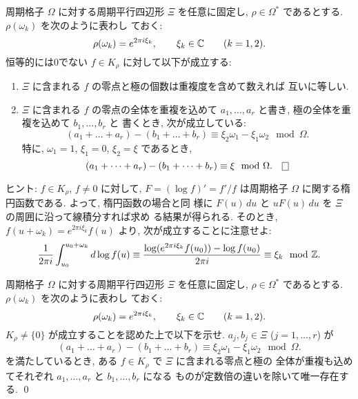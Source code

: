 \documentclass[12pt,twoside]{jarticle}
\def\Z{{\Bbb Z}} %
\def\C{{\Bbb C}} %
\begin{document}
\medskip


\begin{question}
  周期格子 $\Omega$ に対する周期平行四辺形 $\Xi$ を任意に固定し, %
  $\rho\in\Omega^*$ であるとする. $\rho(\omega_k)$ を次のように表わし
  ておく:
  \[
    \rho(\omega_k) = e^{2\pi i\xi_k},
    \qquad
    \xi_k\in\C
    \qquad
    (k=1,2).
  \] %
  恒等的には0でない $f\in K_\rho$ に対して以下が成立する:
  \begin{enumerate}
  \item $\Xi$ に含まれる $f$ の零点と極の個数は重複度を含めて数えれば
    互いに等しい.
  \item $\Xi$ に含まれる $f$ の零点の全体を重複を込めて %
    $a_1,\dots,a_r$ と書き, 極の全体を重複を込めて $b_1,\dots,b_r$ と
    書くとき, 次が成立している:
    \[
      (a_1 + \dots + a_r) - (b_1 + \dots + b_r)
      \equiv
      \xi_2\omega_1 - \xi_1\omega_2
      \mod \Omega. 
    \]
    特に, $\omega_1=1$, $\xi_1=0$, $\xi_2=\xi$ であるとき,
    \[
      (a_1 + \dots + a_r) - (b_1 + \dots + b_r)
      \equiv
      \xi
      \mod \Omega. 
    \qed
    \]
  \end{enumerate}
\end{question}

\noindent ヒント: $f\in K_\rho$, $f\ne0$ に対して, $F=(\log f)'=f'/f$ 
は周期格子 $\Omega$ に関する楕円函数である. よって, 楕円函数の場合と同
様に $F(u)\,du$ と $uF(u)\,du$ を $\Xi$ の周囲に沿って線積分すれば求め
る結果が得られる. そのとき, $f(u+\omega_k)=e^{2\pi i\xi_k}f(u)$ より, 
次が成立することに注意せよ:
\[
  \frac{1}{2\pi i}\int_{u_0}^{u_0+\omega_k} d\log f(u)
  \equiv \frac{\log (e^{2\pi i\xi_k}f(u_0))  - \log f(u_0)}{2\pi i}
  \equiv \xi_k
  \mod \Z.
\]

\begin{question}
  周期格子 $\Omega$ に対する周期平行四辺形 $\Xi$ を任意に固定し, %
  $\rho\in\Omega^*$ であるとする. $\rho(\omega_k)$ を次のように表わし
  ておく:
  \[
    \rho(\omega_k) = e^{2\pi i\xi_k},
    \qquad
    \xi_k\in\C
    \qquad
    (k=1,2).
  \] %
  $K_\rho\ne\{0\}$ が成立することを認めた上で以下を示せ. %
  $a_j,b_j\in\Xi$ ($j=1,\dots,r$) が
  \[
    (a_1 + \dots + a_r) - (b_1 + \dots + b_r)
    \equiv
    \xi_2\omega_1 - \xi_1\omega_2
    \mod \Omega. 
  \] %
  を満たしているとき, ある $f\in K_\rho$ で $\Xi$ に含まれる零点と極の
  全体が重複も込めてそれぞれ $a_1,\dots,a_r$ と $b_1,\dots,b_r$ になる
  ものが定数倍の違いを除いて唯一存在する. \qed
\end{question}
\end{document}
